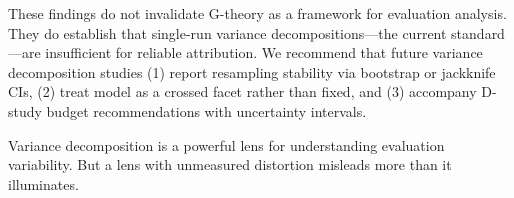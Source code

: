 \documentclass[11pt]{article}
\begin{document}
These findings do not invalidate G-theory as a framework for evaluation analysis.
They do establish that single-run variance decompositions---the current standard---are insufficient for reliable attribution.
We recommend that future variance decomposition studies (1) report resampling stability via bootstrap or jackknife CIs, (2) treat model as a crossed facet rather than fixed, and (3) accompany D-study budget recommendations with uncertainty intervals.

Variance decomposition is a powerful lens for understanding evaluation variability.
But a lens with unmeasured distortion misleads more than it illuminates.


\end{document}
